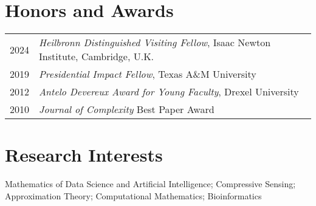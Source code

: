 \documentclass[11pt]{article}
\begin{document}
\section{Honors and Awards}

\begin{tabular}{ll}
2024 & %
{\sl Heilbronn Distinguished Visiting Fellow}, Isaac Newton Institute, Cambridge, U.K.\\
2019 & %
{\sl Presidential Impact Fellow}, Texas A\&M University\\
2012 & %
{\sl Antelo Devereux Award for Young Faculty}, Drexel University\\
2010 & {\sl Journal of Complexity} Best Paper Award\\
\end{tabular}

\section{Research Interests}

Mathematics of Data Science and Artificial Intelligence;
Compressive Sensing;
Approximation Theory; 
Computational Mathematics;
Bioinformatics 


 
\end{document}
